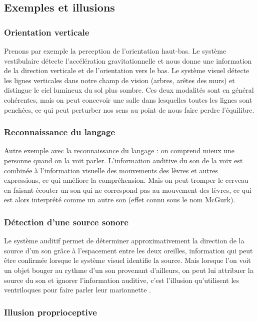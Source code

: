 \subsection{Exemples et illusions}

\subsubsection{Orientation verticale}

Prenons par exemple la perception de l'orientation haut-bas. Le système vestibulaire détecte l'accélération gravitationnelle et nous donne une information de la direction verticale et de l'orientation vers le bas. Le système visuel détecte les lignes verticales dans notre champ de vision (arbres, arêtes des murs) et distingue le ciel lumineux du sol plus sombre. Ces deux modalités sont en général cohérentes, mais on peut concevoir une salle dans lesquelles toutes les lignes sont penchées, ce qui peut perturber nos sens au point de nous faire perdre l'équilibre.

\subsubsection{Reconnaissance du langage}

Autre exemple avec la reconnaissance du langage : on comprend mieux une personne quand on la voit parler. L'information auditive du son de la voix est combinée à l'information visuelle des mouvements des lèvres et autres expressions, ce qui améliore la compréhension. Mais on peut tromper le cerveau en faisant écouter un son qui ne correspond pas au mouvement des lèvres, ce qui est alors interprété comme un autre son (effet connu sous le nom McGurk). 

\subsubsection{Détection d'une source sonore}

Le système auditif permet de déterminer approximativement la direction de la source d'un son grâce à l'espacement entre les deux oreilles, information qui peut être confirmée lorsque le système visuel identifie la source. Mais lorsque l'on voit un objet bouger au rythme d'un son provenant d'ailleurs, on peut lui attribuer la source du son et ignorer l'information auditive, c'est l'illusion qu'utilisent les ventriloques pour faire parler leur marionnette \cite{bonath_neural_2007}.

\subsubsection{Illusion proprioceptive}

